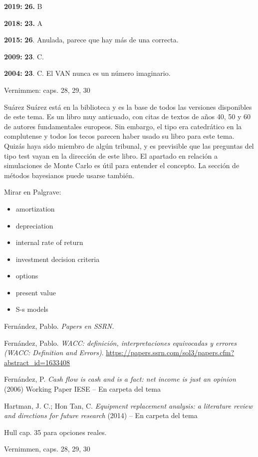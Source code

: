 \documentclass{nuevotema}
\begin{document}
\notas

\textbf{2019:} \textbf{26.} B

\textbf{2018:} \textbf{23.} A

\textbf{2015:} \textbf{26}. Anulada, parece que hay más de una correcta.

\textbf{2009:} \textbf{23}. C.

\textbf{2004:} \textbf{23}. C. El VAN nunca es un número imaginario.


\bibliografia

Vernimmen: caps. 28, 29, 30

Suárez Suárez está en la biblioteca y es la base de todos las versiones disponibles de este tema. Es un libro muy anticuado, con citas de textos de años 40, 50 y 60 de autores fundamentales europeos. Sin embargo, el tipo era catedrático en la complutense y todos los tecos parecen haber usado su libro para este tema. Quizás haya sido miembro de algún tribunal, y es previsible que las preguntas del tipo test vayan en la dirección de este libro. El apartado en relación a simulaciones de Monte Carlo es útil para entender el concepto. La sección de métodos bayesianos puede usarse también.

Mirar en Palgrave:
\begin{itemize}
    \item amortization
    \item depreciation
    \item internal rate of return
    \item investment decision criteria
    \item options
    \item present value
    \item S-s models
\end{itemize}




Fernández, Pablo. \textit{Papers en SSRN.}

Fernández, Pablo. \textit{WACC: definición, interpretaciones equivocadas y errores (WACC: Definition and Errors)}. \url{https://papers.ssrn.com/sol3/papers.cfm?abstract_id=1633408}

Fernández, P. \textit{Cash flow is cash and is a fact: net income is just an opinion} (2006) Working Paper IESE -- En carpeta del tema

Hartman, J. C.; Hon Tan, C. \textit{Equipment replacement analysis: a literature review and directions for future research} (2014) -- En carpeta del tema

Hull cap. 35 para opciones reales.

Vernimmen, caps. 28, 29, 30
\end{document}
